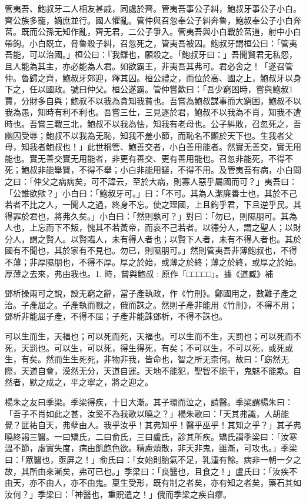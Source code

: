 \begin{pinyinscope}
管夷吾、鮑叔牙二人相友甚戚，同處於齊。管夷吾事公子糾，鮑叔牙事公子小白。齊公族多寵，嫡庶並行。國人懼亂。管仲與召忽奉公子糾奔魯，鮑叔奉公子小白奔莒。既而公孫无知作亂，齊无君，二公子爭入。管夷吾與小白戰於莒道，射中小白帶鉤。小白既立，脅魯殺子糾，召忽死之，管夷吾被囚。鮑叔牙謂桓公曰：「管夷吾能，可以治國。」桓公曰：『我讎也，願殺之。「鮑叔牙曰：」吾聞賢君无私怨，且人能為其主，亦必能為人君。如欲霸王，非夷吾其弗可。君必舍之！「遂召管仲。魯歸之齊，鮑叔牙郊迎，釋其囚。桓公禮之，而位於高、國之上，鮑叔牙以身下之，任以國政。號曰仲父。桓公遂霸。管仲嘗歎曰：「吾少窮困時，嘗與鮑叔1賈，分財多自與；鮑叔不以我為貪知我貧也。吾嘗為鮑叔謀事而大窮困，鮑叔不以我為愚，知時有利不利也。吾嘗三仕，三見逐於君，鮑叔不以我為不肖，知我不遭時也。吾嘗三戰三北，鮑叔不以我為怯，知我有老母也。公子糾敗，召忽死之，吾幽囚受辱；鮑叔不以我為无恥，知我不羞小節，而恥名不顯於天下也。生我者父母，知我者鮑叔也！」此世稱管、鮑善交者，小白善用能者。然實无善交，實无用能也。實无善交實无用能者，非更有善交、更有善用能也。召忽非能死，不得不死；鮑叔非能舉賢，不得不舉；小白非能用讎，不得不用。及管夷吾有病，小白問之曰：「仲父之病病矣，可不諱云，至於大病，則寡人惡乎屬國而可？」夷吾曰：「公誰欲歟？」小白曰：「鮑叔牙可。」曰：「不可。其為人潔廉善士也，其於不己若者不比之人，一聞人之過，終身不忘。使之理國，上且鉤乎君，下且逆乎民。其得罪於君也，將弗久矣。」小白曰：「然則孰可？」對曰：「勿已，則隰朋可。其為人也，上忘而下不叛，愧其不若黃帝，而哀不己若者。以德分人，謂之聖人；以財分人，謂之賢人。以賢臨人，未有得人者也；以賢下人者，未有不得人者也。其於國有不聞也，其於家有不見也。勿已，則隰朋可。」然則管夷吾非薄鮑叔也，不得不薄；非厚隰朋也，不得不厚。厚之於始，或薄之於終；薄之於終，或厚之於始。厚薄之去來，弗由我也。1. 時，嘗與鮑叔 : 原作「□□□□□」。據《道臧》補

鄧析操兩可之說，設无窮之辭，當子產執政，作《竹刑》。鄭國用之，數難子產之治。子產屈之。子產執而戮之，俄而誅之。然則子產非能用《竹刑》，不得不用；鄧析非能屈子產，不得不屈；子產非能誅鄧析，不得不誅也。

可以生而生，天福也；可以死而死，天福也。可以生而不生，天罰也；可以死而不死，天罰也。可以生，可以死，得生得死，有矣；不可以生，不可以死，或死或生，有矣。然而生生死死，非物非我，皆命也，智之所无柰何。故曰：「窈然无際，天道自會，漠然无分，天道自運。天地不能犯，聖智不能干，鬼魅不能欺。自然者，默之成之，平之寧之，將之迎之。

楊朱之友曰季梁。季梁得疾，十日大漸。其子環而泣之，請醫。季梁謂楊朱曰：「吾子不肖如此之甚，汝奚不為我歌以曉之？」楊朱歌曰：「天其弗識，人胡能覺？匪祐自天，弗孽由人。我乎汝乎！其弗知乎！醫乎巫乎！其知之乎？」其子弗曉終謁三醫。一曰矯氏，二曰俞氏，三曰盧氏，診其所疾。矯氏謂季梁曰：「汝寒溫不節，虛實失度，病由飢飽色欲。精慮煩散，非天非鬼，雖漸，可攻也。」季梁曰：「眾醫也，亟屏之！」俞氏曰：「女始則胎氣不足，乳湩有餘。病非一朝一夕之故，其所由來漸矣，弗可已也。」季梁曰：「良醫也，且食之！」盧氏曰：「汝疾不由天，亦不由人，亦不由鬼。稟生受形，既有制之者矣，亦有知之者矣，藥石其如汝何？」季梁曰：「神醫也，重貺遣之！」俄而季梁之疾自瘳。


\end{pinyinscope}
